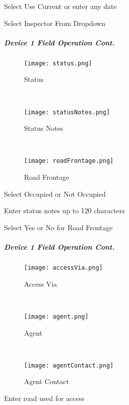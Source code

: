 \noindent Select Use Current or enter any date
\vspace{2in}

\noindent Select Inspector From Dropdown
\clearpage
\subparagraph*{Device 1 Field Operation Cont.}
\begin{wrapfigure}{r}{0.4\textwidth}
\centering
    \texttt{[image: status.png]}
\caption {Status}
\vspace{.05in}

\HRule \\[.4cm] %
\vspace{.05in}

    \texttt{[image: statusNotes.png]}
\caption{Status Notes}
\vspace{.05in}

\HRule \\[.4cm] %
\vspace{.05in}

    \texttt{[image: roadFrontage.png]}
\caption{Road Frontage}
\end{wrapfigure}
Select Occupied or Not Occupied
\vspace{2.5in}

\noindent Enter status notes up to 120 characters
\vspace{2.5in}

\noindent Select Yes or No for Road Frontage
\clearpage
\subparagraph*{Device 1 Field Operation Cont.}
\begin{wrapfigure}{r}{0.4\textwidth}
\centering
    \texttt{[image: accessVia.png]}
\caption {Access Via}
\vspace{.05in}

\HRule \\[.4cm] %
\vspace{.05in}

    \texttt{[image: agent.png]}
\caption{Agent}
\vspace{.05in}

\HRule \\[.4cm] %
\vspace{.05in}

    \texttt{[image: agentContact.png]}
\caption{Agent Contact}
\end{wrapfigure}
Enter road used for access
\vspace{2.5in}

